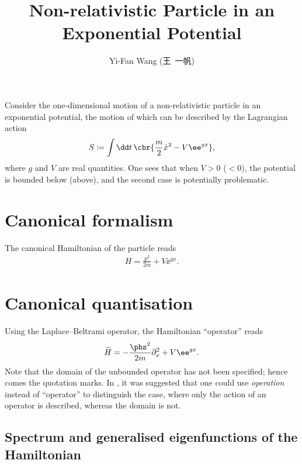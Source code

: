 \documentclass[a4paper,11pt]{article}
\title{Non-relativistic Particle in an Exponential Potential}
\author{Yi-Fan Wang (王\ 一帆)}
\begin{document}
\maketitle

Consider the one-dimensional motion of a non-relativistic particle in an 
exponential potential, the motion of which can be described by the Lagrangian 
action
\begin{align}
S \coloneqq \int \dd t\,\cbr{\frac{m}{2}\dot{x}^2 - V\ee^{g x}},
\end{align}
where $g$ and $V$ are real quantities. One sees that when $V > 0$ ($< 0$), the 
potential is bounded below (above), and the second case is potentially 
problematic.

\section{Canonical formalism}


The canonical Hamiltonian of the particle reads
\begin{align}
H = \frac{p^2}{2m} + V\ee^{g x}.
\end{align}

\section{Canonical quantisation}


Using the Laplace--Beltrami operator, the Hamiltonian ``operator'' reads
\begin{align}
\widehat{H} = -\frac{\phs^2}{2m}\partial_x^2 + V\ee^{g x}.
\label{eq:hamilt-optr-0}
\end{align}
Note that the domain of the unbounded operator has not been specified; hence 
comes the quotation marks. In \cite[ch.\ 4]{Gitman2012}, it was suggested 
that one could use \emph{operation} instead of ``operator'' to distinguish the 
case, where only the action of an operator is described, whereas the domain is 
not.

\subsection{Spectrum and generalised eigenfunctions of the Hamiltonian}

\end{document}
